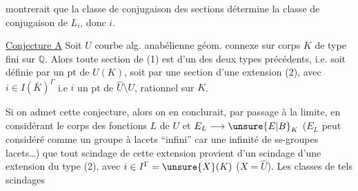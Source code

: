 montrerait que la classe de conjugaison des sections détermine la classe de conjugaison de $L_i$, donc $i$.

\uline{Conjecture A} Soit $U$ courbe alg. anabélienne géom. connexe sur corps $K$ de type fini sur $\mathbb{Q}$. Alors toute section de (1) est  d'un des deux types précédents, i.e. soit définie par un pt de $U(K)$, soit par une section d'une extension (2), avec $i\in I(\bar K)^\Gamma$ i.e $i$ un pt de $\widehat U\setminus U$, rationnel sur $K$.

Si on admet cette conjecture, alors on en conclurait, par passage à la limite, en considérant le corps des fonctions $L$ de $U$ et $E_L\longrightarrow \unsure{E|B}_K$ ($E_L$ peut  considéré comme un groupe à lacets ``infini'' car une infinité de  ss-groupes lacets\ldots) que tout scindage de cette extension provient d'un scindage d'une extension du type (2), avec $i\in I^\Gamma=\unsure{X}(K)$ ($X=\widehat U$). Les classes  de tels scindages
